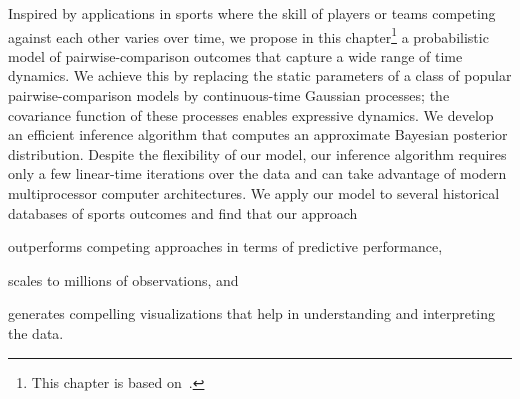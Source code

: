 Inspired by applications in sports where the skill of players or teams competing against each other varies over time, we propose in this chapter\footnote{This chapter is based on~\citet{maystre2019pairwise}.} a probabilistic model of pairwise-comparison outcomes that capture a wide range of time dynamics.
We achieve this by replacing the static parameters of a class of popular pairwise-comparison models by continuous-time Gaussian processes;
the covariance function of these processes enables expressive dynamics.
We develop an efficient inference algorithm that computes an approximate Bayesian posterior distribution.
Despite the flexibility of our model, our inference algorithm requires only a few linear-time iterations over the data and can take advantage of modern multiprocessor computer architectures.
We apply our model to several historical databases of sports outcomes and find that our approach
\begin{enuminline}
	\item outperforms competing approaches in terms of predictive performance,
	\item scales to millions of observations, and
	\item generates compelling visualizations that help in understanding and interpreting the data.
\end{enuminline}
